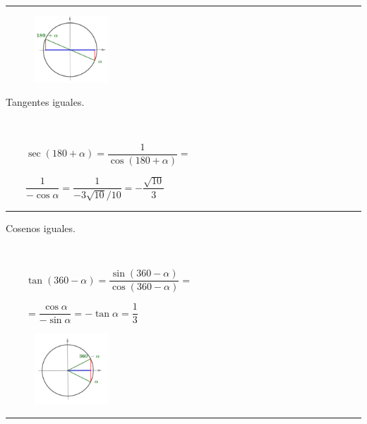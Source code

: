 \begin{miejercicio}
\begin{center} 
\vspace{-6mm}
\rule{300pt}{0.1pt} \end{center}

\begin{multicols}{2}

\begin{figure}[H]
	\centering
	\includegraphics[width=0.25\textwidth]{img-rt/rt20.png}
	\end{figure}
Tangentes iguales.
	
$\quad$
	
$\qquad \sec(180+\alpha)=\dfrac{1}{\cos(180+\alpha)}=$

$\qquad \dfrac{1}{-\cos \alpha}=\dfrac{1}{-3\sqrt{10}/10}=-\dfrac{\sqrt{10}}{3}$
		
\end{multicols}

\begin{center} 
\vspace{-6mm}
\rule{300pt}{0.1pt} \end{center}

\begin{multicols}{2}
Cosenos iguales.

$\quad$

$\qquad \tan (360-\alpha)=\dfrac{\sin (360-\alpha)}{\cos (360-\alpha)}=$

$\qquad =\dfrac{\cos \alpha}{-\sin \alpha}=-\tan \alpha = \dfrac 1 3 $

\begin{figure}[H]
	\centering
	\includegraphics[width=0.25\textwidth]{img-rt/rt21.png}
	\end{figure}

		
\end{multicols}

\begin{center} 
\vspace{-6mm}
\rule{300pt}{0.1pt} \end{center}


\end{miejercicio}
